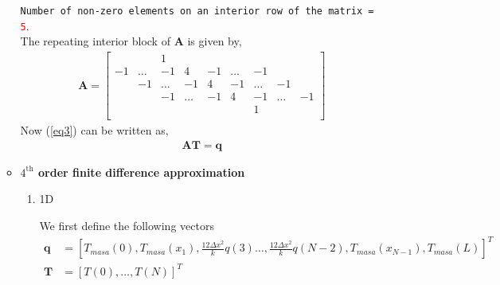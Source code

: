 \documentclass[12 pt, final]{article}
\begin{document}
\begin{itemize}
\begin{itemize}
            \texttt{Number of non-zero elements on an interior row of the matrix = \textcolor{red}{5}}.\\  

            The repeating interior block of $\mathbf{A}$ is given by,
                    \begin{align*}
                    \mathbf{A} = \left[\begin{smallmatrix}
                    &&1\\ -1&\hdots&-1&4&-1&\hdots&-1\\
                     &-1&\hdots&-1&4&-1&\hdots&-1\\
                     &&-1&\hdots&-1&4&-1&\hdots&-1\\
                    &&&&&&1\\
                    \end{smallmatrix}\right]
                \end{align*}
            Now (\ref{eq3}) can be written as,
                \begin{align*}
                    \mathbf{AT} = \mathbf{q}
                \end{align*}
            \item  \textbf{$4^{\text{th}}$ order finite difference approximation}
            \begin{enumerate}
                \item 1D
                
                We first define the following vectors
                \begin{align*}
                    \mathbf{q} &= \left[T_{masa}(0) ,T_{masa}(x_1),\frac{12\Delta x^2}{k}q(3) \hdots,\frac{12\Delta x^2}{k}q(N-2), T_{masa}(x_{N-1}),T_{masa}(L)\right]^T\\
                    \mathbf{T} &= [T(0) ,\hdots, T(N)]^T
                \end{align*}
                

\end{enumerate}
\end{itemize}
\end{itemize}
\end{document}
